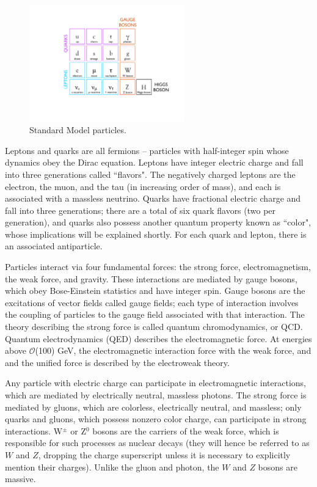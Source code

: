 \begin{figure}
   \begin{center}
      \includegraphics[width=0.6\textwidth]{figures/StandardModelTable}
      \caption{Standard Model particles.}
      \label{fig:StandardModelTable}
   \end{center}
\end{figure}

Leptons and quarks are all fermions -- particles with half-integer spin whose dynamics obey the Dirac equation. Leptons have integer electric charge and fall into three generations called ``flavors". The negatively charged leptons are the electron, the muon, and the tau (in increasing order of mass), and each is associated with a massless neutrino. Quarks have fractional electric charge and fall into three generations; there are a total of six quark flavors (two per generation), and quarks also possess another quantum property known as ``color", whose implications will be explained shortly. For each quark and lepton, there is an associated antiparticle.

Particles interact via four fundamental forces: the strong force, electromagnetism, the weak force, and gravity. These interactions are mediated by gauge bosons, which obey Bose-Einstein statistics and have integer spin. Gauge bosons are the excitations of vector fields called gauge fields; each type of interaction involves the coupling of particles to the gauge field associated with that interaction. The theory describing the strong force is called quantum chromodynamics, or QCD. Quantum electrodynamics (QED) describes the electromagnetic force. At energies above $\mathcal{O}$(100) GeV, the electromagnetic interaction force with the weak force, and and the unified force is described by the electroweak theory.

Any particle with electric charge can participate in electromagnetic interactions, which are mediated by electrically neutral, massless photons. The strong force is mediated by gluons, which are colorless, electrically neutral, and massless; only quarks and gluons, which possess nonzero color charge, can participate in strong interactions. W$^{\pm}$ or Z$^{0}$ bosons are the carriers of the weak force, which is responsible for such processes as nuclear decays (they will hence be referred to as $W$ and $Z$, dropping the charge superscript unless it is necessary to explicitly mention their charges). Unlike the gluon and photon, the $W$ and $Z$ bosons are massive.

